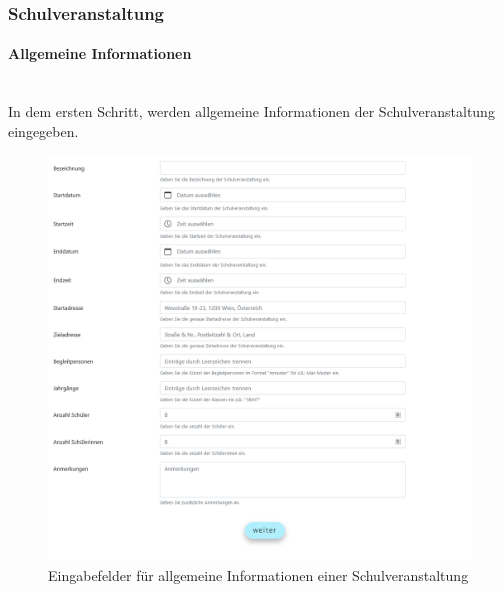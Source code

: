 \subsubsection{Schulveranstaltung}
\paragraph{Allgemeine Informationen}~\\
In dem ersten Schritt, werden allgemeine Informationen der Schulveranstaltung eingegeben.
\begin{figure}[H]
	\centering
	\includegraphics[width=1\linewidth]{images/schoolgeneral}
	\caption[Schulveranstaltung]{Eingabefelder für allgemeine Informationen einer Schulveranstaltung}
	\label{fig:schoolgeneral}
\end{figure}
